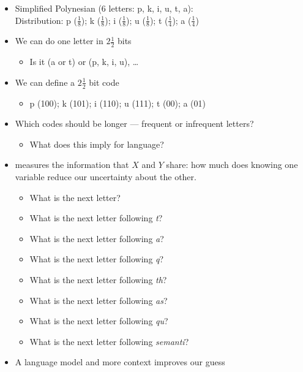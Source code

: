 \documentclass[headrule,footrule]{foils}
\begin{document}
\begin{itemize}
\item Simplified Polynesian (6 letters: p, k, i, u, t, a):
\\ Distribution:  p ($\frac{1}{8}$);
k ($\frac{1}{8}$);
i ($\frac{1}{8}$);
u ($\frac{1}{8}$);
   t ($\frac{1}{4}$);
   a ($\frac{1}{4}$)
\item We can do one letter in $2 \frac{1}{2}$ bits
  \begin{itemize}
  \item Is it (a or t) or (p, k, i, u), \ldots
  \end{itemize}
\item We can define a $2 \frac{1}{2}$ bit code 
  \begin{itemize}
  \item p (100); k (101); i (110); u (111); t (00);  a (01)  
  \end{itemize}
\item Which codes should be longer --- frequent or infrequent letters?
  \begin{itemize}
  \item What does this imply for language?
  \end{itemize}
\end{itemize}



\begin{itemize}
\item {} measures the information that $X$ and $Y$ share:
how much does knowing one variable reduce our
uncertainty about the other.
\begin{itemize}
\item What is the next letter?
\item What is the next letter following \textit{t}?
\item What is the next letter following \textit{a}?
\item What is the next letter following \textit{q}?
\item What is the next letter following \textit{th}?
\item What is the next letter following \textit{as}?
\item What is the next letter following \textit{qu}?
\item What is the next letter following \textit{semanti}?
\end{itemize}
\item A language model and more context improves our guess
\end{itemize}
\end{document}
